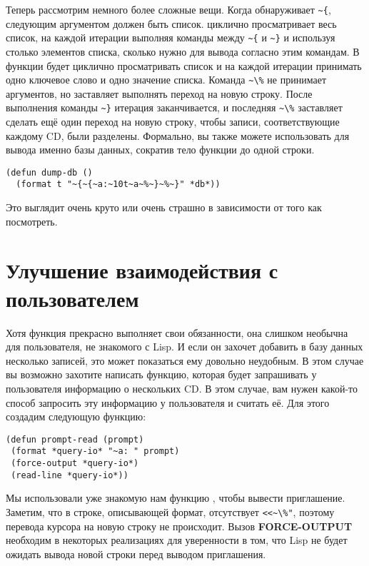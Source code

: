 Теперь рассмотрим немного более сложные вещи. Когда  обнаруживает
\lstinline!~{!, следующим аргументом должен быть список.  циклично
  просматривает весь список, на каждой итерации выполняя команды между \lstinline!~{! и
    \lstinline!~}! и используя столько элементов списка, сколько нужно для вывода согласно
  этим командам. В функции   будет циклично просматривать
  список и на каждой итерации принимать одно ключевое слово и одно значение
  списка. Команда \lstinline!~\%! не принимает аргументов, но заставляет 
  выполнять переход на новую строку. После выполнения команды \lstinline!~}! итерация
заканчивается, и последняя \lstinline!~\%! заставляет  сделать ещё один
переход на новую строку, чтобы записи, соответствующие каждому CD, были разделены.
Формально, вы также можете использовать  для вывода именно базы данных,
сократив тело функции  до одной строки.

\begin{lstlisting}
(defun dump-db ()
  (format t "~{~{~a:~10t~a~%~}~%~}" *db*))
\end{lstlisting}

Это выглядит очень круто или очень страшно в зависимости от того как посмотреть.

\section{Улучшение взаимодействия с пользователем}

Хотя функция  прекрасно выполняет свои обязанности, она слишком необычна
для пользователя, не знакомого с Lisp. И если он захочет добавить в базу данных несколько
записей, это может показаться ему довольно неудобным. В этом случае вы возможно захотите
написать функцию, которая будет запрашивать у пользователя информацию о нескольких CD. В
этом случае, вам нужен какой-то способ запросить эту информацию у пользователя и считать
её. Для этого создадим следующую функцию:

\begin{lstlisting}
(defun prompt-read (prompt)
 (format *query-io* "~a: " prompt)
 (force-output *query-io*)
 (read-line *query-io*))
\end{lstlisting}

Мы использовали уже знакомую нам функцию , чтобы вывести
приглашение. Заметим, что в строке, описывающей формат, отсутствует \lstinline{<<~\%"},
поэтому перевода курсора на новую строку не происходит. Вызов \textbf{FORCE-OUTPUT}
необходим в некоторых реализациях для уверенности в том, что Lisp не будет ожидать вывода
новой строки перед выводом приглашения.

